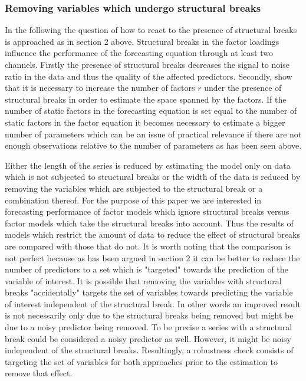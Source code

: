 \documentclass[12pt]{article}
\begin{document}
\subsubsection{Removing variables which undergo structural breaks}

In the following the question of how to react to the presence of structural breaks is approached as in section 2 above. Structural breaks in the factor loadings influence the performance of the forecasting equation through at least two channels. Firstly the presence of structural breaks decreases the signal to noise ratio in the data and thus the quality of the affected predictors. Secondly, \citet{breitung2011testing} show that it is necessary to increase the number of factors $r$ under the presence of structural breaks in order to estimate the space spanned by the factors. If the number of static factors in the forecasting equation is set equal to the number of static factors in the factor equation it becomes necessary to estimate a bigger number of parameters which can be an issue of practical relevance if there are not enough observations relative to the number of parameters as has been seen above.


Either the length of the series is reduced by estimating the model only on data which is not subjected to structural breaks or the width of the data is reduced by removing the variables which are subjected to the structural break or a combination thereof. For the purpose of this paper we are interested in forecasting performance of factor models which ignore structural breaks versus factor models which take the structural breaks into account. Thus the results of models which restrict the amount of data to reduce the effect of structural breaks are compared with those that do not. It is worth noting that the comparison is not perfect because as has been argued in section $2$ it can be better to reduce the number of predictors to a set which is "targeted" towards the prediction of the variable of interest. It is possible that removing the variables with structural breaks "accidentally" targets the set of variables towards predicting the variable of interest independent of the structural break. In other words an improved result is not necessarily only due to the structural breaks being removed but might be due to a noisy predictor being removed. To be precise a series with a structural break could be considered a noisy predictor as well. However, it might be noisy independent of the structural breaks.
Resultingly, a robustness check consists of targeting the set of variables for both approaches prior to the estimation to remove that effect.
\end{document}
